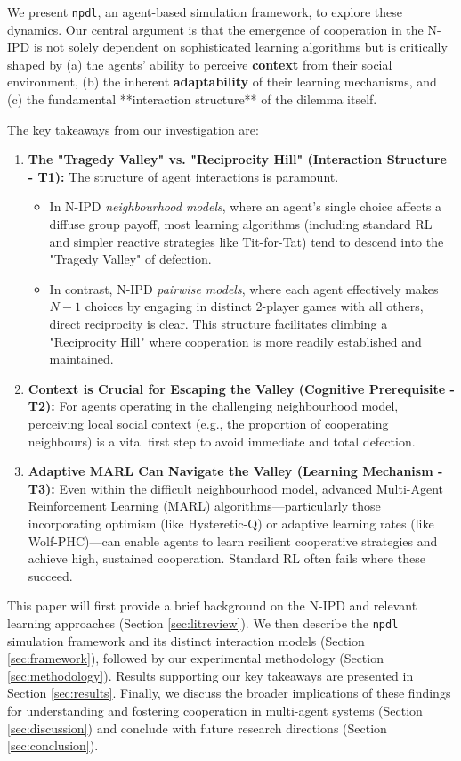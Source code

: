 \documentclass[]{llncs} %
\begin{document}
We present \texttt{npdl}, an agent-based simulation framework, to explore these dynamics. Our central argument is that the emergence of cooperation in the N-IPD is not solely dependent on sophisticated learning algorithms but is critically shaped by (a) the agents' ability to perceive \textbf{context} from their social environment, (b) the inherent \textbf{adaptability} of their learning mechanisms, and (c) the fundamental **interaction structure** of the dilemma itself.

The key takeaways from our investigation are:
\begin{enumerate}
    \item \textbf{The "Tragedy Valley" vs. "Reciprocity Hill" (Interaction Structure - T1):} The structure of agent interactions is paramount.
        \begin{itemize}
            \item In N-IPD \textit{neighbourhood models}, where an agent's single choice affects a diffuse group payoff, most learning algorithms (including standard RL and simpler reactive strategies like Tit-for-Tat) tend to descend into the "Tragedy Valley" of defection.
            \item In contrast, N-IPD \textit{pairwise models}, where each agent effectively makes $N-1$ choices by engaging in distinct 2-player games with all others, direct reciprocity is clear. This structure facilitates climbing a "Reciprocity Hill" where cooperation is more readily established and maintained.
        \end{itemize}
    \item \textbf{Context is Crucial for Escaping the Valley (Cognitive Prerequisite - T2):} For agents operating in the challenging neighbourhood model, perceiving local social context (e.g., the proportion of cooperating neighbours) is a vital first step to avoid immediate and total defection.
    \item \textbf{Adaptive MARL Can Navigate the Valley (Learning Mechanism - T3):} Even within the difficult neighbourhood model, advanced Multi-Agent Reinforcement Learning (MARL) algorithms—particularly those incorporating optimism (like Hysteretic-Q) or adaptive learning rates (like Wolf-PHC)—can enable agents to learn resilient cooperative strategies and achieve high, sustained cooperation. Standard RL often fails where these succeed.
\end{enumerate}

This paper will first provide a brief background on the N-IPD and relevant learning approaches (Section \ref{sec:litreview}). We then describe the \texttt{npdl} simulation framework and its distinct interaction models (Section \ref{sec:framework}), followed by our experimental methodology (Section \ref{sec:methodology}). Results supporting our key takeaways are presented in Section \ref{sec:results}. Finally, we discuss the broader implications of these findings for understanding and fostering cooperation in multi-agent systems (Section \ref{sec:discussion}) and conclude with future research directions (Section \ref{sec:conclusion}).
\end{document}
